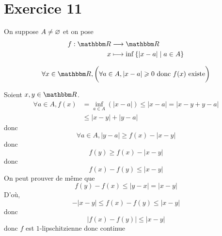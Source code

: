 \part{Exercice 11}

On suppose $A \neq \varnothing$ et on pose
\begin{align*}
	f: \R &\longrightarrow \R \\
	x &\longmapsto \inf\left\{ \left| x-a \right|  \mid a \in A \right\} 
\end{align*}

\[
	\forall x \in \R, \bigg( \forall a \in A, \left| x-a \right| \ge 0 \text{ donc } f(x) \text{ existe} \bigg) 
\] 

Soient $x,y \in \R$.
\begin{align*}
	\forall a \in A, f(x) &= \inf_{a\in A}\left( \left| x-a \right|  \right) \le \left| x-a \right| =\left| x-y+y-a \right| \\
												&\le \left| x-y \right| + \left| y-a \right| 
\end{align*}
donc \[
	\forall a \in A, \left| y-a \right| \ge f(x) - \left| x-y \right| 
\] donc \[
	f(y) \ge f(x) - \left| x - y \right| 
\] donc \[
	f(x) - f(y) \le \left| x -y \right|
\] On peut prouver de même que \[
	f(y) - f(x) \le \left| y-x \right|  = \left| x -y \right| 
\] D'où, \[
	-\left| x-y \right| \le f(x) - f(y) \le \left| x-y \right| 
\] donc \[
	\left| f(x) - f(y) \right| \le \left| x-y \right| 
\] donc $f$ est $1$-lipschitzienne donc continue
